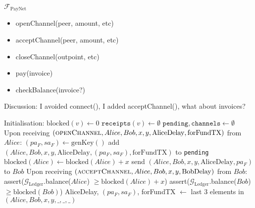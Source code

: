 \begin{functionality}{$\mathcal{F}_{\mathrm{PayNet}}$}
  \label{alg:payfunc}
    \begin{itemize}
      \item openChannel(peer, amount, etc)
      \item acceptChannel(peer, amount, etc)
      \item closeChannel(outpoint, etc)
      \item pay(invoice)
      \item checkBalance(invoice?)
    \end{itemize}
    Discussion: I avoided connect(), I added acceptChannel(), what about
    invoices?
  \begin{algorithmic}[1]
    \State Initialisation:
      \Indent
        \State $\mathrm{blocked}\left(v\right) \gets 0$
        \State $\mathtt{receipts}\left(v\right) \gets \emptyset$
      \EndFor
      \State $\mathtt{pending}, \mathtt{channels} \gets \emptyset$
      \EndIndent
    \State
    \State Upon receiving $\left(\textsc{openChannel}, Alice, Bob, x, y,
    \mathrm{AliceDelay}, \mathrm{forFundTX}\right)$ from $Alice$:
    \Indent
        \State $\left(pa_F, sa_F\right) \gets \mathrm{genKey}\left(\right)$
        \State add $\left(Alice, Bob, x, y, \mathrm{AliceDelay}, \left(pa_F,
        sa_F\right), \mathrm{forFundTX}\right)$ to \texttt{pending}
        \State $\mathrm{blocked}\left(Alice\right) \leftarrow
        \mathrm{blocked}\left(Alice\right) + x$
        \State send $\left(Alice, Bob, x, y, \mathrm{AliceDelay}, pa_F\right)$
        to $Bob$ 
      \EndIf
    \EndIndent
    \State
    \State Upon receiving $\left(\textsc{acceptChannel}, Alice, Bob, x, y,
    \mathrm{BobDelay}\right)$ from $Bob$: 
    \Indent
        \State assert($\mathcal{G}_{\mathrm{Ledger}}$.balance($Alice$) $\geq
        \mathrm{blocked}\left(Alice\right) + x$)
        \State assert($\mathcal{G}_{\mathrm{Ledger}}$.balance($Bob$) $\geq
        \mathrm{blocked}\left(Bob\right)$)
        \State AliceDelay, $\left(pa_F, sa_F\right)$, forFundTX $\gets$ last 3
        elements in $\left(Alice, Bob, x, y, \_, \_, \_\right)$

\end{algorithmic}
\end{functionality}
